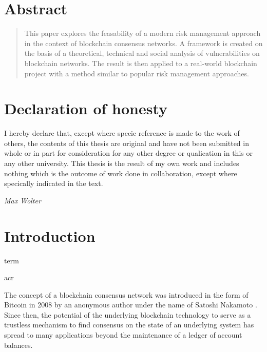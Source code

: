 \documentclass[12pt,a4paper]{article}
\begin{document}
\newpage

\vspace{4cm}

\section*{Abstract}

\begin{abstract}
  This paper explores the feasability of a modern risk management approach in the context of blockchain consensus networks. A framework is created on the basis of a theoretical, technical and social analysis of vulnerabilities on blockchain networks. The result is then applied to a real-world blockchain project with a method similar to popular risk management approaches.
\end{abstract}

\newpage

\section*{Declaration of honesty}

I hereby declare that, except where specic reference is made to the work of others, the contents of this thesis are original and have not been submitted in whole or in part for consideration for any other degree or qualication in this or any other university. This thesis is the result of my own work and includes nothing which is the outcome of work done in collaboration, except where specically indicated in the text.\\
\vspace{4cm}
\begin{displayquote}
  \textit{Max Wolter}
\end{displayquote}

\newpage

\onehalfspacing
\tableofcontents
\singlespacing
\newpage

\section{Introduction}

\gls{term}

\acrshort{acr}

The concept of a blockchain consensus network was introduced in the form of Bitcoin in 2008 by an anonymous author under the name of Satoshi Nakamoto \cite{bitcoin}. Since then, the potential of the underlying blockchain technology to serve as a trustless mechanism to find consensus on the state of an underlying system has spread to many applications beyond the maintenance of a ledger of account balances.\\
\end{document}
